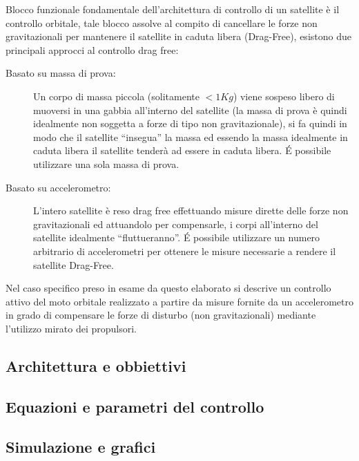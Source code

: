 Blocco funzionale fondamentale dell'architettura di controllo di un satellite è
il controllo orbitale, tale blocco assolve al compito di cancellare le forze
non gravitazionali per mantenere il satellite in caduta libera (Drag-Free),
esistono due principali approcci al controllo drag free:

\begin{description}
\item[Basato su massa di prova:]  Un corpo di massa piccola (solitamente
$<1Kg$) viene sospeso libero di muoversi in una gabbia all'interno del satellite
(la massa di prova è quindi idealmente non soggetta a forze di tipo non
gravitazionale), si fa quindi in modo che il satellite ``insegua'' la massa ed
essendo la massa idealmente in caduta libera il satellite tenderà ad essere in
caduta libera. \'E possibile utilizzare una sola massa di prova.
\item[Basato su accelerometro:] L'intero satellite è reso drag free effettuando
misure dirette delle forze non gravitazionali ed attuandolo per compensarle, i
corpi all'interno del satellite idealmente ``fluttueranno''. \'E possibile
utilizzare un numero arbitrario di accelerometri per ottenere le misure
necessarie a rendere il satellite Drag-Free.
\end{description}

Nel caso specifico preso in esame da questo elaborato si descrive un controllo
attivo del moto orbitale realizzato a partire da misure fornite da un
accelerometro in grado di compensare le forze di disturbo (non gravitazionali)
mediante l'utilizzo mirato dei propulsori.

\subsection{Architettura e obbiettivi}

\subsection{Equazioni e parametri del controllo}

\subsection{Simulazione e grafici}

